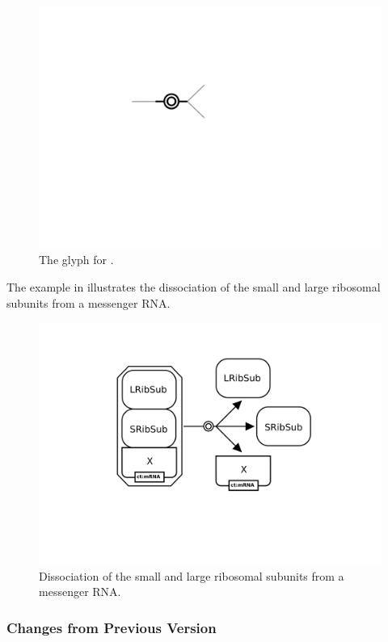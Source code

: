 \begin{figure}[H]
  \centering
  \includegraphics[scale = 0.5]{images/dissociation}
  \caption{The \PD glyph for .}
  \label{fig:dissociation}
\end{figure}

The example in  illustrates the dissociation of the small and large ribosomal subunits from a messenger RNA.

\begin{figure}[H]
  \centering
  \includegraphics[scale = 0.3]{examples/dissociation-ribosome}
  \caption{Dissociation of the small and large ribosomal subunits from a messenger RNA.}
  \label{fig:dissoc-ribo}
\end{figure}

\subsubsection{Changes from Previous Version}

